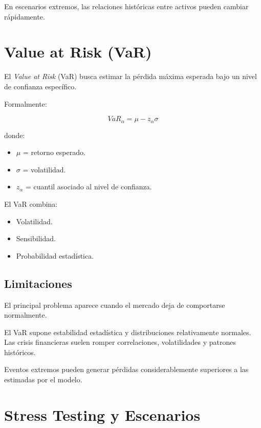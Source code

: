 En escenarios extremos, las relaciones históricas entre activos pueden cambiar rápidamente.

\section{Value at Risk (VaR)}

El \textit{Value at Risk} (VaR) busca estimar la pérdida máxima esperada bajo un nivel de confianza específico.

Formalmente:

\[
VaR_{\alpha} = \mu - z_{\alpha}\sigma
\]

donde:

\begin{itemize}
    \item $\mu$ = retorno esperado.
    \item $\sigma$ = volatilidad.
    \item $z_{\alpha}$ = cuantil asociado al nivel de confianza.
\end{itemize}

El VaR combina:

\begin{itemize}
    \item Volatilidad.
    \item Sensibilidad.
    \item Probabilidad estadística.
\end{itemize}

\subsection{Limitaciones}

El principal problema aparece cuando el mercado deja de comportarse normalmente.

\begin{tcolorbox}[colback=yellow!10,colframe=black,title=Limitación Fundamental]
El VaR supone estabilidad estadística y distribuciones relativamente normales. Las crisis financieras suelen romper correlaciones, volatilidades y patrones históricos.
\end{tcolorbox}

Eventos extremos pueden generar pérdidas considerablemente superiores a las estimadas por el modelo.

\section{Stress Testing y Escenarios}

